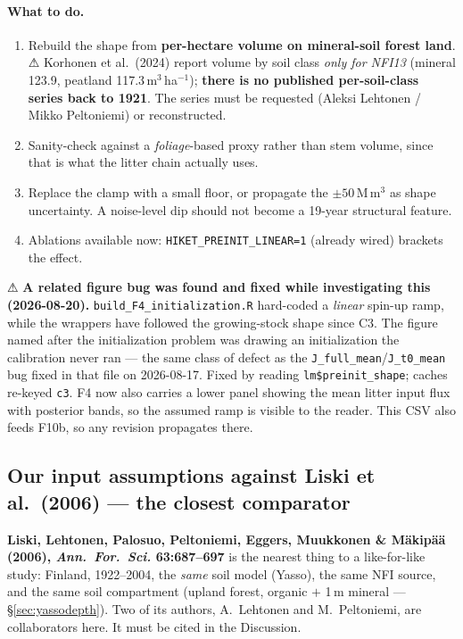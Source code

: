 \documentclass[11pt]{article}
\begin{document}
\paragraph{What to do.}
\begin{enumerate}
\item Rebuild the shape from \textbf{per-hectare volume on mineral-soil forest land}. ⚠ Korhonen
      et al.\ (2024) report volume by soil class \emph{only for NFI13} (mineral 123.9, peatland
      117.3\,m$^3$\,ha$^{-1}$); \textbf{there is no published per-soil-class series back to 1921}.
      The series must be requested (Aleksi Lehtonen / Mikko Peltoniemi) or reconstructed.
\item Sanity-check against a \emph{foliage}-based proxy rather than stem volume, since that is what
      the litter chain actually uses.
\item Replace the clamp with a small floor, or propagate the $\pm 50$\,M\,m$^3$ as shape uncertainty.
      A noise-level dip should not become a 19-year structural feature.
\item Ablations available now: \texttt{HIKET\_PREINIT\_LINEAR=1} (already wired) brackets the effect.
\end{enumerate}

⚠ \textbf{A related figure bug was found and fixed while investigating this (2026-08-20).}
\texttt{build\_F4\_initialization.R} hard-coded a \emph{linear} spin-up ramp, while the wrappers have
followed the growing-stock shape since C3. The figure named after the initialization problem was
drawing an initialization the calibration never ran --- the same class of defect as the
\texttt{J\_full\_mean}/\texttt{J\_t0\_mean} bug fixed in that file on 2026-08-17. Fixed by reading
\texttt{lm\$preinit\_shape}; caches re-keyed \texttt{c3}. F4 now also carries a lower panel showing
the mean litter input flux with posterior bands, so the assumed ramp is visible to the reader.
This CSV also feeds F10b, so any revision propagates there.

\subsection{Our input assumptions against Liski et al.\ (2006) --- the closest comparator}
\label{sec:liskicompare}

\textbf{Liski, Lehtonen, Palosuo, Peltoniemi, Eggers, Muukkonen \& Mäkipää (2006),
\emph{Ann.\ For.\ Sci.} 63:687--697} is the nearest thing to a like-for-like study: Finland,
1922--2004, the \emph{same} soil model (Yasso), the same NFI source, and the same soil compartment
(upland forest, organic $+$ 1\,m mineral --- \S\ref{sec:yassodepth}). Two of its authors,
A.\ Lehtonen and M.\ Peltoniemi, are collaborators here. It must be cited in the Discussion.
\end{document}
